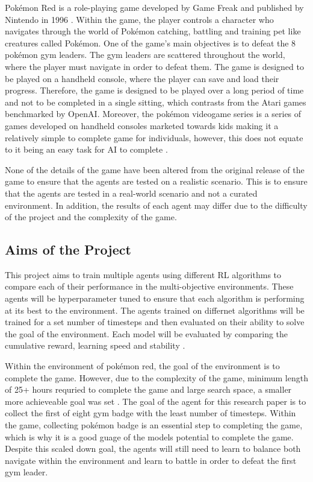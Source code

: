 Pokémon Red is a role-playing game developed by Game Freak and published by Nintendo in 1996 \cite{HubZ_1998}. Within the game, the player controls a character who navigates through the world of Pokémon catching, battling and training pet like creatures called Pokémon. One of the game's main objectives is to defeat the 8 pokémon gym leaders. The gym leaders are scattered throughout the world, where the player must navigate in order to defeat them. The game is designed to be played on a handheld console, where the player can save and load their progress. Therefore, the game is designed to be played over a long period of time and not to be completed in a single sitting, which contrasts from the Atari games benchmarked by OpenAI. Moreover, the pokémon videogame series is a series of games developed on handheld consoles marketed towards kids making it a relatively simple to complete game for individuals, however, this does not equate to it being an easy task for AI to complete \cite{HubZ_1998}. 

None of the details of the game have been altered from the original release of the game to ensure that the agents are tested on a realistic scenario. This is to ensure that the agents are tested in a real-world scenario and not a curated environment. In addition, the results of each agent may differ due to the difficulty of the project and the complexity of the game.  

\subsection{Aims of the Project}

This project aims to train multiple agents using different RL algorithms to compare each of their performance in the multi-objective environments. These agents will be hyperparameter tuned to ensure that each algorithm is performing at its best to the environment. The agents trained on differnet algorithms will be trained for a set number of timesteps and then evaluated on their ability to solve the goal of the environment. Each model will be evaluated by comparing the cumulative reward, learning speed and stability \cite{Sutton1}. 

Within the environment of pokémon red, the goal of the environment is to complete the game. However, due to the complexity of the game, minimum length of 25+ hours requried to complete the game and large search space, a smaller more achieveable goal was set \cite{howlongtobeat}. The goal of the agent for this research paper is to collect the first of eight gym badge with the least number of timesteps. Within the game, collecting pokémon badge is an essential step to completing the game, which is why it is a good guage of the models potential to complete the game. Despite this scaled down goal, the agents will still need to learn to balance both navigate within the environment and learn to battle in order to defeat the first gym leader.